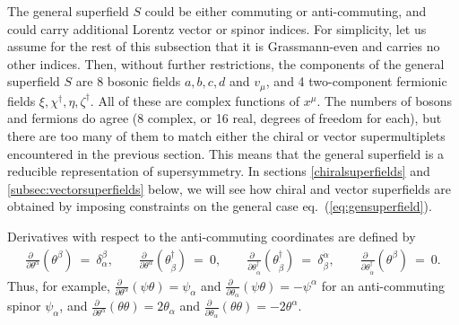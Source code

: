\documentclass[12pt]{article}
\def\beq{\begin{eqnarray}}
\def\eeq{\end{eqnarray}}
\begin{document}
The general superfield $S$ could be either commuting or anti-commuting, and could carry 
additional Lorentz vector or spinor indices. For simplicity, let us 
assume for the rest of this subsection that it is Grassmann-even and 
carries no other indices. Then, without further restrictions, the 
components of the general superfield $S$ are 8 bosonic fields $a,b,c,d$ 
and $v_\mu$, and 4 two-component fermionic fields 
$\xi,\chi^\dagger,\eta,\zeta^\dagger$. All of these are complex functions 
of $x^\mu$. The numbers of bosons and fermions do agree (8 complex, or 16 
real, degrees of freedom for each), but there are too many of them to 
match either the chiral or vector supermultiplets encountered in the 
previous section. This means that the general superfield is a reducible
representation of supersymmetry.
In sections \ref{chiralsuperfields} and \ref{subsec:vectorsuperfields} 
below, we will see how chiral and vector superfields are 
obtained by imposing constraints on the general case 
eq.~(\ref{eq:gensuperfield}).

Derivatives with respect to the anti-commuting coordinates are defined by
\beq
\frac{\partial\phantom{x}}{\partial\theta^\alpha} (\theta^\beta) 
\>=\> \delta^\beta_\alpha ,
\qquad
\frac{\partial\phantom{x}}{\partial\theta^\alpha} 
(\theta^\dagger_{\dot\beta}) \>=\> 0 ,
\qquad
\frac{\partial\phantom{x}}{\partial\theta^\dagger_{\dot\alpha}} 
(\theta^\dagger_{\dot\beta}) \>=\> 
\delta^{\dot\alpha}_{\dot\beta} ,
\qquad
\frac{\partial\phantom{x}}{\partial\theta^\dagger_{\dot\alpha}} 
(\theta^{\beta}) \>=\> 0 .
\eeq
Thus, for example, 
$\frac{\partial\phantom{x}}{\partial\theta^\alpha}(\psi\theta) = \psi_\alpha$
and
$\frac{\partial\phantom{x}}{\partial\theta_\alpha}(\psi\theta) = -\psi^\alpha$ 
for an anti-commuting spinor $\psi_\alpha$, and
$\frac{\partial\phantom{x}}{\partial\theta^\alpha}(\theta\theta) = 2 
\theta_\alpha$ and 
$\frac{\partial\phantom{x}}{\partial\theta_\alpha}(\theta\theta) = -2 
\theta^\alpha$.
\end{document}
